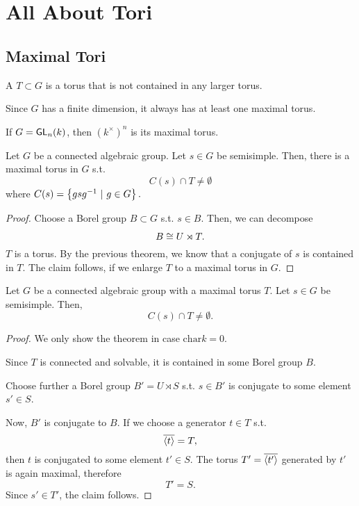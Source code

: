 \section{All About Tori}
\subsection{Maximal Tori}
\begin{definition}
	A  $T \subset G$ is a torus that is not contained in any larger torus.
	
	Since $G$ has a finite dimension, it always has at least one maximal torus.
\end{definition}
\begin{example}
	If $G = \textsf{GL}_n(k)$, then $(k^\times)^n$ is its maximal torus.
\end{example}
\begin{lemma}
	Let $G$ be a connected algebraic group. Let $s \in G$ be semisimple. Then, there is a maximal torus in $G$ s.t.
	\[ C(s) \cap T \neq \emptyset \]
	where $C(s) = \left\lbrace gsg^{-1} ~ | ~ g\in G\right\rbrace.$
\end{lemma}
\begin{proof}
	Choose a Borel group $B \subset G$ s.t. $s \in B$. Then, we can decompose
	\[ B \overset{}{\cong} U \rtimes T. \]
	$T$ is a torus. By the previous theorem, we know that a conjugate of $s$ is contained in $T$. The claim follows, if we enlarge $T$ to a maximal torus in $G$.
\end{proof}

\begin{theorem}
	Let $G$ be a connected algebraic group with a maximal torus $T$. Let $s \in G$ be semisimple. Then, 
	\[ C(s) \cap T \neq \emptyset. \]
\end{theorem}
\begin{proof}
	We only show the theorem in case $\mathrm{char} k = 0$.
	
	Since $T$ is connected and solvable, it is contained in some Borel group $B$.
	
	Choose further a Borel group $B' = U \rtimes S$ s.t. $s\in B'$ is conjugate to some element $s' \in S$.
	
	Now, $B'$ is conjugate to $B$. If we choose a generator $t \in T$ s.t.
	\[ \overline{\left<t\right>} = T, \]
	then $t$ is conjugated to some element $t' \in S$. The torus $T' = \overline{\left<t'\right>}$ generated by $t'$ is again maximal, therefore
	\[ T' = S. \]
	Since $s' \in T'$, the claim follows.
\end{proof}

